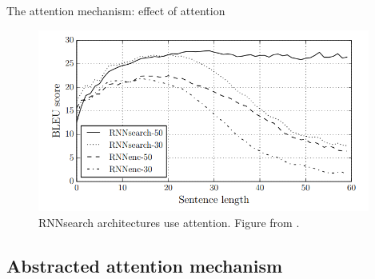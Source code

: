 \documentclass[12pt,aspectratio=169,handout]{beamer}
\begin{document}
\begin{frame}{The attention mechanism: effect of attention}
	\begin{figure}[h]
		\includegraphics[height=6cm]{sequence_length}
		\caption*{RNNsearch architectures use attention. Figure from \cite{bahdanau2014neural}.}
	\end{figure}	
\end{frame}


\subsection{Abstracted attention mechanism}
\end{document}
